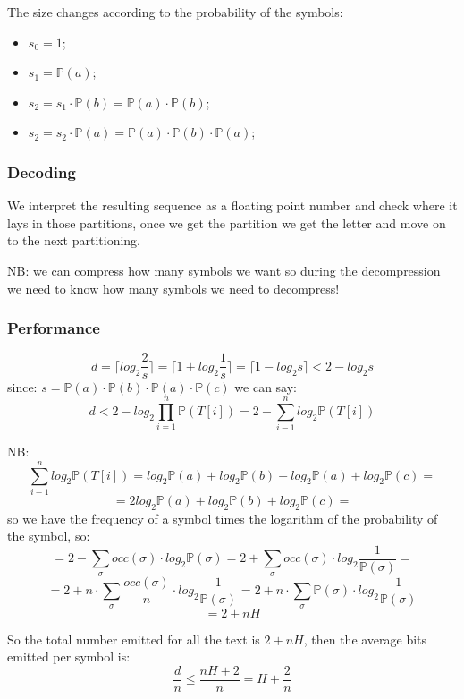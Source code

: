 The size changes according to the probability of the symbols:
\begin{itemize}
    \item $s_0 = 1$;
    \item $s_1 = \mathbb{P}(a)$;
    \item $s_2 = s_1 \cdot \mathbb{P}(b) = \mathbb{P}(a) \cdot \mathbb{P}(b) $;
    \item $s_2 = s_2 \cdot \mathbb{P}(a) = \mathbb{P}(a) \cdot \mathbb{P}(b) \cdot \mathbb{P}(a) $;
\end{itemize}

\subsubsection{Decoding}
We interpret the resulting sequence as a floating point number and check where it lays in those partitions, once we get the partition we get the letter and move on to the next partitioning.

NB: we can compress how many symbols we want so during the decompression we need to know how many symbols we need to decompress!

\subsubsection{Performance}
$$
    d = \lceil log_2 \frac{2}{s} \rceil = \lceil 1 + log_2 \frac{1}{s} \rceil = \lceil 1 - log_2 s \rceil < 2 - log_2 s
$$
since: $s = \mathbb{P}(a) \cdot \mathbb{P}(b) \cdot \mathbb{P}(a) \cdot \mathbb{P}(c)$ we can say:
$$
    d < 2 - log_2 \prod_{i=1}^n \mathbb{P}(T[i]) = 2 - \sum_{i-1}^n log_2 \mathbb{P}(T[i])
$$

NB: 
$$
    \sum_{i-1}^n log_2 \mathbb{P}(T[i]) = log_2 \mathbb{P}(a) + log_2 \mathbb{P}(b) + log_2 \mathbb{P}(a) + log_2 \mathbb{P}(c) = 
$$
$$
    = 2log_2 \mathbb{P}(a) + log_2 \mathbb{P}(b) + log_2 \mathbb{P}(c) = 
$$
so we have the frequency of a symbol times the logarithm of the probability of the symbol, so:
$$
    = 2 - \sum_{\sigma} occ(\sigma) \cdot log_2 \mathbb{P}(\sigma) = 2 + \sum_{\sigma} occ(\sigma) \cdot log_2 \frac{1}{\mathbb{P}(\sigma)} = 
$$
$$
    = 2 + n \cdot \sum_{\sigma} \frac{occ(\sigma)}{n} \cdot log_2 \frac{1}{\mathbb{P}(\sigma)} = 2 + n \cdot \sum_{\sigma} \mathbb{P}(\sigma) \cdot log_2 \frac{1}{\mathbb{P}(\sigma)}
$$
$$
 = 2 + nH
$$

So the total number emitted for all the text is $2 + nH$, then the average bits emitted per symbol is:
$$
\frac{d}{n} \leq \frac{nH + 2}{n} = H + \frac{2}{n}
$$

